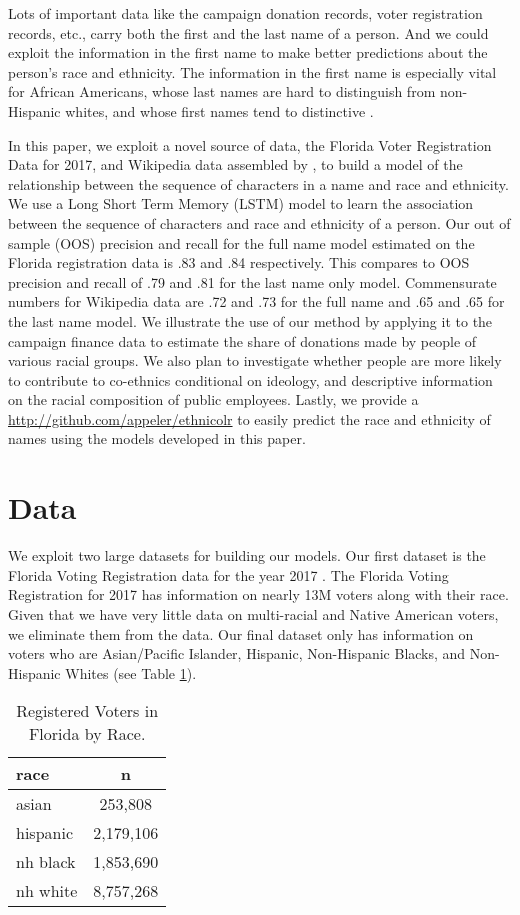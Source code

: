 \documentclass[12pt, letterpaper]{article}
\begin{document}
Lots of important data like the campaign donation records, voter registration records, etc., carry both the first and the last name of a person. And we could exploit the information in the first name to make better predictions about the person's race and ethnicity. The information in the first name is especially vital for African Americans, whose last names are hard to distinguish from non-Hispanic whites, and whose first names tend to distinctive \citep{bertrand2004emily}. 

In this paper, we exploit a novel source of data, the Florida Voter Registration Data for 2017, and Wikipedia data assembled by \citet{ambekar2009name}, to build a model of the relationship between the sequence of characters in a name and race and ethnicity. We use a Long Short Term Memory (LSTM) model \citep{graves2005framewise} to learn the association between the sequence of characters and race and ethnicity of a person. Our out of sample (OOS) precision and recall for the full name model estimated on the Florida registration data is .83 and .84 respectively. This compares to OOS precision and recall of .79 and .81 for the last name only model. Commensurate numbers for Wikipedia data are .72 and .73 for the full name and .65 and .65 for the last name model. We illustrate the use of our method by applying it to the campaign finance data to estimate the share of donations made by people of various racial groups. We also plan to investigate whether people are more likely to contribute to co-ethnics conditional on ideology, and descriptive information on the racial composition of public employees. Lastly, we provide a \href{Python package}{http://github.com/appeler/ethnicolr} to easily predict the race and ethnicity of names using the models developed in this paper.

\section*{Data}
We exploit two large datasets for building our models. Our first dataset is the Florida Voting Registration data for the year 2017 \citep{sood_2017}. The Florida Voting Registration for 2017 has information on nearly 13M voters along with their race. Given that we have very little data on multi-racial and Native American voters, we eliminate them from the data. Our final dataset only has information on voters who are Asian/Pacific Islander, Hispanic, Non-Hispanic Blacks, and Non-Hispanic Whites (see Table \ref{table:fl_data}). 

\begin{table}[h!]
\centering
\caption{Registered Voters in Florida by Race.}
\begin{tabular}{ l c }
\hline    
race & n \\
\hline
asian & 253,808 \\
hispanic & 2,179,106 \\
nh black & 1,853,690 \\
nh white & 8,757,268 \\
\hline
\end{tabular}
\label{table:fl_data}
\end{table}
\end{document}
